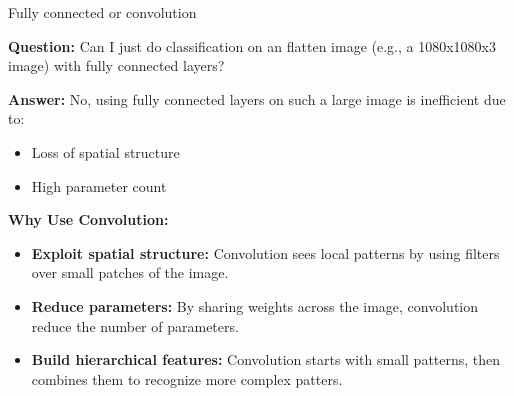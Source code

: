 \documentclass[default, aspectratio=169]{beamer}
\begin{document}
	\begin{frame}{Fully connected or convolution}
		
		\textbf{Question:}
		Can I just do classification on an flatten image (e.g., a 1080x1080x3 image) with fully connected layers?
		
		\bigskip
		
		\textbf{Answer:} 
		No, using fully connected layers on such a large image is inefficient due to:
		\begin{itemize}
			\item Loss of spatial structure
			\item High parameter count
		\end{itemize}
		
		\bigskip
		
		\textbf{Why Use Convolution:}
		\begin{itemize}
			\item \textbf{Exploit spatial structure:} Convolution sees local patterns by using filters over small patches of the image.
			\item \textbf{Reduce parameters:} By sharing weights across the image, convolution reduce the number of parameters.
			\item \textbf{Build hierarchical features:} Convolution starts with small patterns, then combines them to recognize more complex patters.
		\end{itemize}
		
	\end{frame}	
\end{document}
